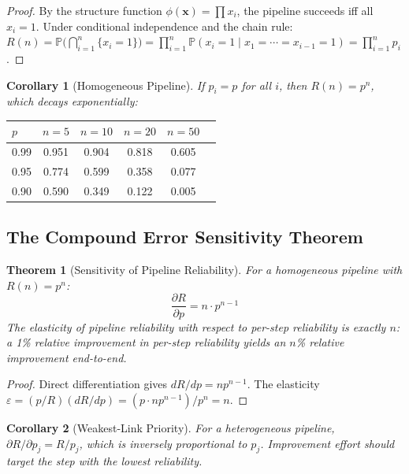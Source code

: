 \documentclass[11pt, a4paper, logo, copyright]{googledeepmind}
\newtheorem{theorem}{Theorem}[section]
\newtheorem{corollary}{Corollary}[section]
\newcommand{\Prob}{\mathbb{P}}
\begin{document}
\begin{proof}
By the structure function $\phi(\mathbf{x}) = \prod x_i$, the pipeline succeeds iff all $x_i = 1$.
Under conditional independence and the chain rule:
$R(n) = \Prob\!\bigl(\bigcap_{i=1}^{n} \{x_i = 1\}\bigr) = \prod_{i=1}^{n} \Prob(x_i = 1 \mid x_1 = \cdots = x_{i-1} = 1) = \prod_{i=1}^{n} p_i$.
\end{proof}

\begin{corollary}[Homogeneous Pipeline]
If $p_i = p$ for all $i$, then $R(n) = p^n$, which decays exponentially:
\end{corollary}

\begin{center}
\begin{tabular}{lccccc}
\toprule
$p$ & $n{=}5$ & $n{=}10$ & $n{=}20$ & $n{=}50$ \\
\midrule
0.99 & 0.951 & 0.904 & 0.818 & 0.605 \\
0.95 & 0.774 & 0.599 & 0.358 & 0.077 \\
0.90 & 0.590 & 0.349 & 0.122 & 0.005 \\
\bottomrule
\end{tabular}
\end{center}

\subsection{The Compound Error Sensitivity Theorem}

\begin{theorem}[Sensitivity of Pipeline Reliability]
\label{thm:sensitivity}
For a homogeneous pipeline with $R(n) = p^n$:
\begin{equation}
\frac{\partial R}{\partial p} = n \cdot p^{n-1}
\end{equation}
The elasticity of pipeline reliability with respect to per-step reliability is exactly $n$: a 1\% relative improvement in per-step reliability yields an $n$\% relative improvement end-to-end.
\end{theorem}

\begin{proof}
Direct differentiation gives $dR/dp = np^{n-1}$.
The elasticity $\varepsilon = (p/R)(dR/dp) = (p \cdot n p^{n-1})/p^n = n$.
\end{proof}

\begin{corollary}[Weakest-Link Priority]
\label{cor:weakest}
For a heterogeneous pipeline, $\partial R / \partial p_j = R / p_j$, which is inversely proportional to $p_j$.
Improvement effort should target the step with the lowest reliability.
\end{corollary}
\end{document}
